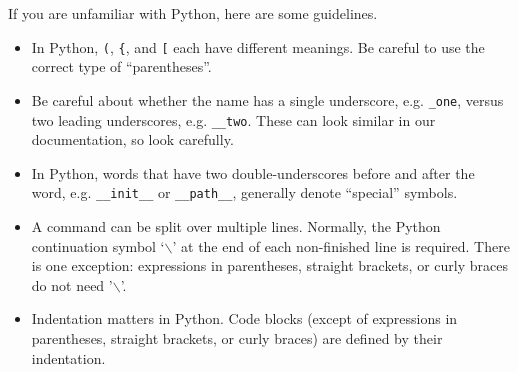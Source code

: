 If you are unfamiliar with Python, here are some guidelines.

\begin{itemize}
  \item In Python, \pythonindex \verb|(|, \verb|{|, and \verb|[| each have different
  meanings.  Be careful to use the correct type of ``parentheses''.
  \item Be careful about whether the name has a single underscore, e.g.
  \verb|_one|, versus two leading underscores, e.g. \verb|__two|.  These can
  look similar in our documentation, so look carefully.
  \item In Python, \pythonindex words that have two double-underscores before and after the
  word, e.g. \verb|__init__| or \verb|__path__|, generally denote ``special''
  symbols.
  \item A command can be split over multiple lines. Normally, the Python continuation symbol `$\backslash$'
  at the end of each non-finished line is required. There is one exception:
  expressions in parentheses, straight brackets, or curly braces do not need '$\backslash$'.
  \item Indentation matters in Python. Code blocks (except of expressions in parentheses, straight brackets, or curly braces)
  are defined by their indentation.
\end{itemize}


